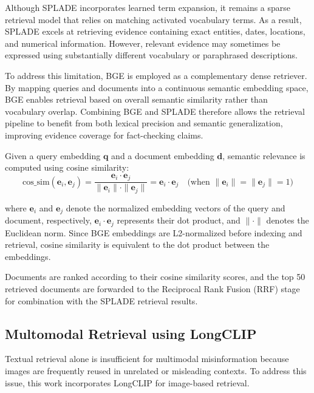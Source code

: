 Although SPLADE incorporates learned term expansion, it remains a sparse retrieval model that relies on matching activated vocabulary terms. As a result, SPLADE excels at retrieving evidence containing exact entities, dates, locations, and numerical information. However, relevant evidence may sometimes be expressed using substantially different vocabulary or paraphrased descriptions.

To address this limitation, BGE is employed as a complementary dense retriever. By mapping queries and documents into a continuous semantic embedding space, BGE enables retrieval based on overall semantic similarity rather than vocabulary overlap. Combining BGE and SPLADE therefore allows the retrieval pipeline to benefit from both lexical precision and semantic generalization, improving evidence coverage for fact-checking claims.

Given a query embedding $\mathbf{q}$ and a document embedding $\mathbf{d}$, semantic relevance is computed using cosine similarity:
\begin{equation}
\label{eq:bge_cosine_similarity}
    \text{cos\_sim}(\mathbf{e}_i, \mathbf{e}_j) = \frac{\mathbf{e}_i \cdot \mathbf{e}_j}{\|\mathbf{e}_i\| \cdot \|\mathbf{e}_j\|} = \mathbf{e}_i \cdot \mathbf{e}_j \quad \text{(when } \|\mathbf{e}_i\| = \|\mathbf{e}_j\| = 1\text{)}
\end{equation}

where $\mathbf{e}_i$ and $\mathbf{e}_j$ denote the normalized embedding vectors of the query and document, respectively, $\mathbf{e}_i \cdot \mathbf{e}_j$ represents their dot product, and $\|\cdot\|$ denotes the Euclidean norm. Since BGE embeddings are L2-normalized before indexing and retrieval, cosine similarity is equivalent to the dot product between the embeddings.


Documents are ranked according to their cosine similarity scores, and the top 50 retrieved documents are forwarded to the Reciprocal Rank Fusion (RRF) stage for combination with the SPLADE retrieval results.




\subsection{Multomodal Retrieval using LongCLIP}

Textual retrieval alone is insufficient for multimodal misinformation because images are frequently reused in unrelated or misleading contexts. To address this issue, this work incorporates LongCLIP for image-based retrieval.

